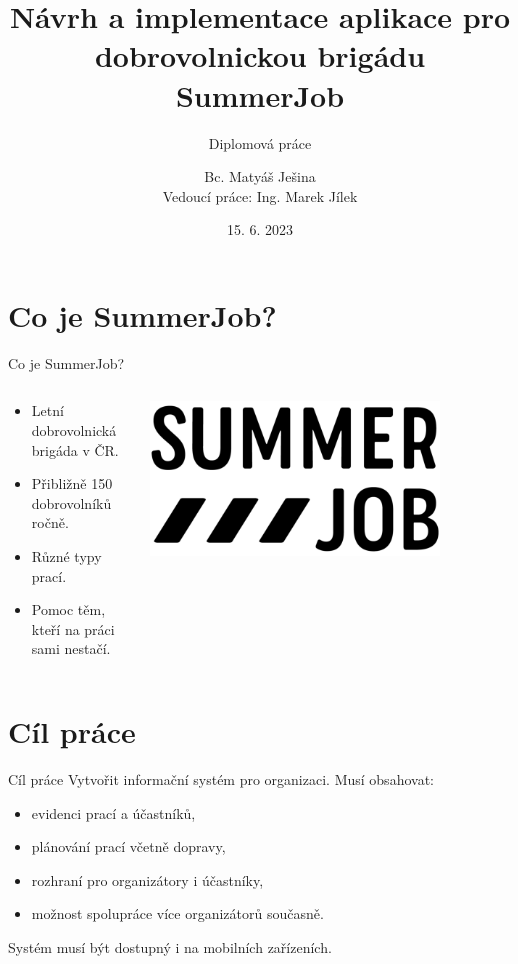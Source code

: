 \documentclass[czech,aspectratio=169]{beamer}
\title[Aplikace pro SummerJob]{Návrh a implementace aplikace pro dobrovolnickou brigádu SummerJob}
\subtitle{Diplomová práce}
\institute[FIT ČVUT v Praze]{Fakulta informačních technologií \\ České vysoké učení technické v Praze}
\author[M. Ješina]{Bc. Matyáš Ješina \\ Vedoucí práce: Ing. Marek Jílek}
\date{15. 6. 2023}
\begin{document}
  \begin{frame}
    \titlepage 
  \end{frame}
  

  \section{Co je SummerJob?}
  \begin{frame}{Co je SummerJob?}
    \begin{columns}
      \begin{column}{.65\textwidth}
        \begin{itemize}
          \item Letní dobrovolnická brigáda v ČR.
          \item Přibližně 150 dobrovolníků ročně.
          \item Různé typy prací.
          \item Pomoc těm, kteří na práci sami nestačí.
        \end{itemize}
      \end{column}
  \begin{column}{.3\textwidth}
    \includegraphics[width=0.8\textwidth]{summerjob-logo}
  \end{column}
\end{columns}
  \end{frame}
  
  \section{Cíl práce}
  \begin{frame}{Cíl práce}
    Vytvořit informační systém pro organizaci. Musí obsahovat:
    \begin{itemize}
      \item evidenci prací a účastníků,
      \item plánování prací včetně dopravy,
      \item rozhraní pro organizátory i účastníky,
      \item možnost spolupráce více organizátorů současně.
    \end{itemize}
    Systém musí být dostupný i na mobilních zařízeních.
  \end{frame}
\end{document}
